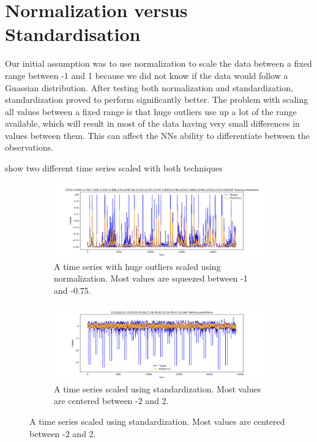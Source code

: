\section{Normalization versus Standardisation}
Our initial assumption was to use normalization to scale the data between a
fixed range between -1 and 1 because we did not know if the data would follow a Guassian
distribution. After testing both normalization and standardization,
standardization proved to perform significantly better.
The problem with scaling all values between a fixed range is that huge
outliers use up a lot of the range available, which will result in
most of the data having very small differences in values between them.
This can affect the NNs ability to differentiate between the observations.

 show two different time series
scaled with both techniques
\begin{figure}[h!]
  \centering
  \caption{Effects of different scaling techniques on a dataset with huge outliers.}
  \label{fig:time-series-standardization-vs-normalization}
  \begin{subfigure}[b]{0.49\textwidth}
    \includegraphics[width=\textwidth]{./figs/dataset/time-series_scaled_normalization2.png}
    \hfill
    \caption{A time series with huge outliers scaled using normalization. Most values are squeezed between -1 and -0.75.}
    \label{fig:time-series-normalization}
  \end{subfigure}
  \begin{subfigure}[b]{0.49\textwidth}
    \includegraphics[width=\textwidth]{./figs/dataset/time-series_scaled_standardization.png}
    \hfill
    \caption{A time series scaled using standardization. Most values are centered between -2 and 2.}
    \label{fig:time-series-standardization}
  \end{subfigure}
\end{figure}

